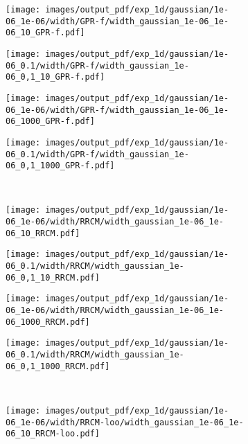 \documentclass[a4paper,14pt]{extarticle}
\begin{document}
\begin{figure}%
  \centering
  \begin{subfigure}[b]{0.25\linewidth}
    \texttt{[image: images/output\_pdf/exp\_1d/gaussian/1e-06\_1e-06/width/GPR-f/width\_gaussian\_1e-06\_1e-06\_10\_GPR-f.pdf]}
  \end{subfigure}%
  \begin{subfigure}[b]{0.25\linewidth}
    \texttt{[image: images/output\_pdf/exp\_1d/gaussian/1e-06\_0.1/width/GPR-f/width\_gaussian\_1e-06\_0,1\_10\_GPR-f.pdf]}
  \end{subfigure}%
  \begin{subfigure}[b]{0.25\linewidth}
    \texttt{[image: images/output\_pdf/exp\_1d/gaussian/1e-06\_1e-06/width/GPR-f/width\_gaussian\_1e-06\_1e-06\_1000\_GPR-f.pdf]}
  \end{subfigure}%
  \begin{subfigure}[b]{0.25\linewidth}
    \texttt{[image: images/output\_pdf/exp\_1d/gaussian/1e-06\_0.1/width/GPR-f/width\_gaussian\_1e-06\_0,1\_1000\_GPR-f.pdf]}
  \end{subfigure}\\
  \begin{subfigure}[b]{0.25\linewidth}
    \texttt{[image: images/output\_pdf/exp\_1d/gaussian/1e-06\_1e-06/width/RRCM/width\_gaussian\_1e-06\_1e-06\_10\_RRCM.pdf]}
  \end{subfigure}%
  \begin{subfigure}[b]{0.25\linewidth}
    \texttt{[image: images/output\_pdf/exp\_1d/gaussian/1e-06\_0.1/width/RRCM/width\_gaussian\_1e-06\_0,1\_10\_RRCM.pdf]}
  \end{subfigure}%
  \begin{subfigure}[b]{0.25\linewidth}
    \texttt{[image: images/output\_pdf/exp\_1d/gaussian/1e-06\_1e-06/width/RRCM/width\_gaussian\_1e-06\_1e-06\_1000\_RRCM.pdf]}
  \end{subfigure}%
  \begin{subfigure}[b]{0.25\linewidth}
    \texttt{[image: images/output\_pdf/exp\_1d/gaussian/1e-06\_0.1/width/RRCM/width\_gaussian\_1e-06\_0,1\_1000\_RRCM.pdf]}
  \end{subfigure}\\
  \begin{subfigure}[b]{0.25\linewidth}
    \texttt{[image: images/output\_pdf/exp\_1d/gaussian/1e-06\_1e-06/width/RRCM-loo/width\_gaussian\_1e-06\_1e-06\_10\_RRCM-loo.pdf]}

\end{subfigure}
\end{figure}
\end{document}

